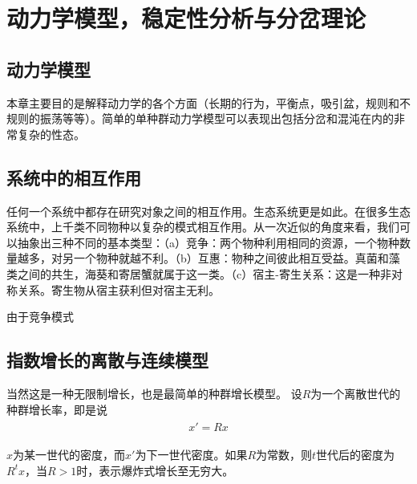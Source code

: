 \chapter{动力学模型，稳定性分析与分岔理论}
\section{动力学模型}
本章主要目的是解释动力学的各个方面（长期的行为，平衡点，吸引盆，规则和不规则的振荡等等）。简单的单种群动力学模型可以表现出包括分岔和混沌在内的非常复杂的性态。
\section{系统中的相互作用}
任何一个系统中都存在研究对象之间的相互作用。生态系统更是如此。在很多生态系统中，上千类不同物种以复杂的模式相互作用。从一次近似的角度来看，我们可以抽象出三种不同的基本类型：（a）竞争：两个物种利用相同的资源，一个物种数量越多，对另一个物种就越不利。（b）互惠：物种之间彼此相互受益。真菌和藻类之间的共生，海葵和寄居蟹就属于这一类。（c）宿主-寄生关系：这是一种非对称关系。寄生物从宿主获利但对宿主无利。

由于竞争模式

\section{指数增长的离散与连续模型}
当然这是一种无限制增长，也是最简单的种群增长模型。
设\begin{math}R\end{math}为一个离散世代的种群增长率，即是说
\begin{align}
	\begin{split}
		\label{eq:feedforward}
		{x}'=Rx
	\end{split}
\end{align}

\begin{math}x\end{math}为某一世代的密度，而\begin{math}{x}'\end{math}为下一世代密度。如果\begin{math}R\end{math}为常数，则\begin{math}t\end{math}世代后的密度为\begin{math}R^{t}x\end{math}，当\begin{math}R>1\end{math}时，表示爆炸式增长至无穷大。

